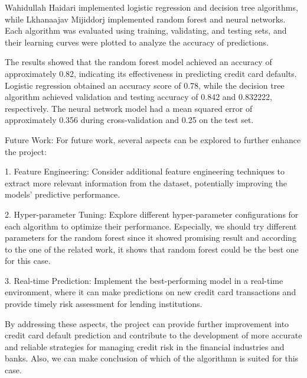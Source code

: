 \documentclass[nohyperref]{article}
\theoremstyle{plain}
\theoremstyle{definition}
\theoremstyle{remark}
\begin{document}
Wahidullah Haidari implemented logistic regression and decision tree algorithms, while Lkhanaajav Mijiddorj implemented random forest and neural networks. Each algorithm was evaluated using training, validating, and testing sets, and their learning curves were plotted to analyze the accuracy of predictions.

The results showed that the random forest model achieved an accuracy of approximately 0.82, indicating its effectiveness in predicting credit card defaults. Logistic regression obtained an accuracy score of 0.78, while the decision tree algorithm achieved validation and testing accuracy of 0.842 and 0.832222, respectively. The neural network model had a mean squared error of approximately 0.356 during cross-validation and 0.25 on the test set.

Future Work:
For future work, several aspects can be explored to further enhance the project:

1. Feature Engineering: Consider additional feature engineering techniques to extract more relevant information from the dataset, potentially improving the models' predictive performance.

2. Hyper-parameter Tuning: Explore different hyper-parameter configurations for each algorithm to optimize their performance. Especially, we should try different parameters for the random forest since it showed promising result and according to the one of the related work, it shows that random forest could be the best one for this case.

3. Real-time Prediction: Implement the best-performing model in a real-time environment, where it can make predictions on new credit card transactions and provide timely risk assessment for lending institutions.

By addressing these aspects, the project can provide further improvement into credit card default prediction and contribute to the development of more accurate and reliable strategies for managing credit risk in the financial industries and banks. Also, we can make conclusion of which of the algorithmn is suited for this case. 



\end{document}
